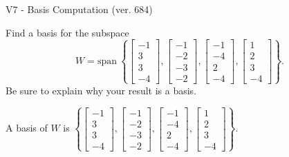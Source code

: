 \begin{exercise}
  \begin{exerciseTitle}V7 - Basis Computation (ver. 684)\end{exerciseTitle}
  \begin{exerciseStatement}
    Find a basis for the subspace 
\[W=\mathrm{span}\ \left\{\left[\begin{array}{r}
-1 \\
3 \\
3 \\
-4
\end{array}\right] , \left[\begin{array}{r}
-1 \\
-2 \\
-3 \\
-2
\end{array}\right] , \left[\begin{array}{r}
-1 \\
-4 \\
2 \\
-4
\end{array}\right] , \left[\begin{array}{r}
1 \\
2 \\
3 \\
-4
\end{array}\right]\right\}.\]
 Be sure to explain why your result is a basis.


  \end{exerciseStatement}
  \begin{exerciseAnswer}
   A basis of \(W\) is  \(\left\{\left[\begin{array}{r}
-1 \\
3 \\
3 \\
-4
\end{array}\right] , \left[\begin{array}{r}
-1 \\
-2 \\
-3 \\
-2
\end{array}\right] , \left[\begin{array}{r}
-1 \\
-4 \\
2 \\
-4
\end{array}\right] , \left[\begin{array}{r}
1 \\
2 \\
3 \\
-4
\end{array}\right]\right\}\).
  


  \end{exerciseAnswer}
\end{exercise}